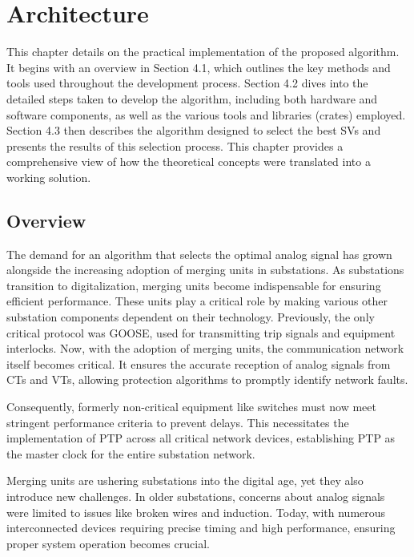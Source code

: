 
\chapter{Architecture} %

\label{chap:Chapter4} %


This chapter details on the practical implementation of the proposed algorithm. It begins with an overview in Section 4.1, which outlines the key methods and tools used throughout the development process. Section 4.2 dives into the detailed steps taken to develop the algorithm, including both hardware and software components, as well as the various tools and libraries (crates) employed. Section 4.3 then describes the algorithm designed to select the best SVs and presents the results of this selection process. This chapter provides a comprehensive view of how the theoretical concepts were translated into a working solution.

\section{Overview}

The demand for an algorithm that selects the optimal analog signal has grown alongside the increasing adoption of merging units in substations. As substations transition to digitalization, merging units become indispensable for ensuring efficient performance. These units play a critical role by making various other substation components dependent on their technology. Previously, the only critical protocol was GOOSE, used for transmitting trip signals and equipment interlocks. Now, with the adoption of merging units, the communication network itself becomes critical. It ensures the accurate reception of analog signals from CTs and VTs, allowing protection algorithms to promptly identify network faults.

Consequently, formerly non-critical equipment like switches must now meet stringent performance criteria to prevent delays. This necessitates the implementation of PTP across all critical network devices, establishing PTP as the master clock for the entire substation network.

Merging units are ushering substations into the digital age, yet they also introduce new challenges. In older substations, concerns about analog signals were limited to issues like broken wires and induction. Today, with numerous interconnected devices requiring precise timing and high performance, ensuring proper system operation becomes crucial.

